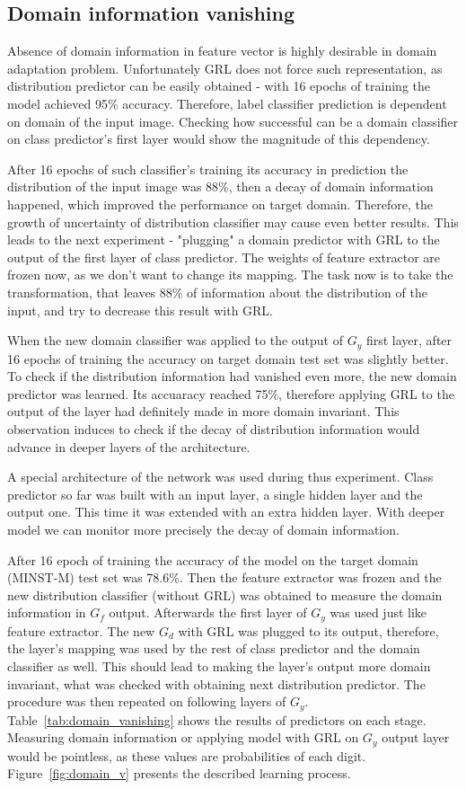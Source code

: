 \documentclass{article}
\begin{document}
\subsection{Domain information vanishing}
Absence of domain information in feature vector is highly desirable in domain adaptation problem. Unfortunately GRL does not force such representation, as distribution predictor can be easily obtained - with 16 epochs of training the model achieved 95\% accuracy. Therefore, label classifier prediction is dependent on domain of the input image. Checking how successful can be a domain classifier on class predictor's first layer would show the magnitude of this dependency. 
\par
After 16 epochs of such classifier's training its accuracy in prediction the distribution of the input image was 88\%, then a decay of domain information happened, which improved the performance on target domain. Therefore, the growth of uncertainty of distribution classifier may cause even better results. This leads to the next experiment - "plugging" a domain predictor with GRL to the output of the first layer of class predictor. The weights of feature extractor are frozen now, as we don't want to change its mapping. The task now is to take the transformation, that leaves 88\% of information about the distribution of the input, and try to decrease this result with GRL.
\par
When the new domain classifier was applied to the output of $G_{y}$ first layer, after 16 epochs of training the accuracy on target domain test set was slightly better. To check if the distribution information had vanished even more, the new domain predictor was learned. Its accuaracy reached 75\%, therefore applying GRL to the output of the layer had definitely made in more domain invariant. This observation induces to check if the decay of distribution information would advance in deeper layers of the architecture.
\par
A special architecture of the network was used during thus experiment. Class predictor so far was built with an input layer, a single hidden layer and the output one. This time it was extended with an extra hidden layer. With deeper model we can monitor more precisely the decay of domain information. 
\par
After 16 epoch of training the accuracy of the model on the target domain (MINST-M) test set was 78.6\%. Then the feature extractor was frozen and the new distribution classifier (without GRL) was obtained to measure the domain information in $G_{f}$ output. Afterwards the first layer of $G_{y}$ was used just like feature extractor. The new $G_{d}$ with GRL was plugged to its output, therefore, the layer's mapping was used by the rest of class predictor and the domain classifier as well. This should lead to making the layer's output more domain invariant, what was checked with obtaining next distribution predictor. The procedure was then repeated on following layers of $G_{y}$. Table~\ref{tab:domain_vanishing} shows the results of predictors on each stage. Measuring domain information or applying model with GRL on $G_{y}$ output layer would be pointless, as these values are probabilities of each digit. Figure~\ref{fig:domain_v} presents the described learning process.
\end{document}
